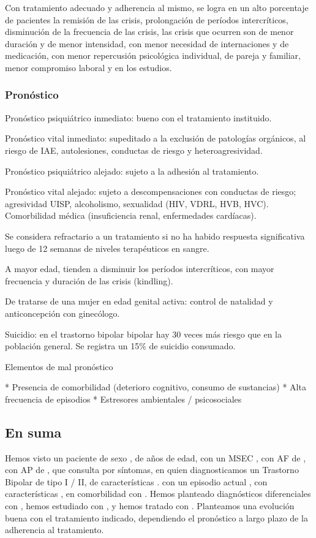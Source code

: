 Con tratamiento adecuado y adherencia al mismo, se logra en un alto porcentaje de pacientes la remisión de las crisis, prolongación de períodos intercríticos, disminución de la frecuencia de las crisis, las crisis que ocurren son de menor duración y de menor intensidad, con menor necesidad de internaciones y de medicación, con menor repercusión psicológica individual, de pareja y familiar, menor compromiso laboral y en los estudios.
\subsubsection*{Pronóstico}
Pronóstico psiquiátrico inmediato: bueno con el tratamiento instituido.

Pronóstico vital inmediato: supeditado a la exclusión de patologías orgánicos, al riesgo de IAE, autolesiones, conductas de riesgo y heteroagresividad.

Pronóstico psiquiátrico alejado: sujeto a la adhesión al tratamiento.

Pronóstico vital alejado: sujeto a descompensaciones con conductas de riesgo; agresividad UISP, alcoholismo, sexualidad (HIV, VDRL, HVB, HVC). Comorbilidad médica (insuficiencia renal, enfermedades cardíacas).

Se considera refractario a un tratamiento si no ha habido respuesta significativa luego de 12 semanas de niveles terapéuticos en sangre.

A mayor edad, tienden a disminuir los períodos intercríticos, con mayor frecuencia y duración de las crisis (kindling).

De tratarse de una mujer en edad genital activa: control de natalidad y anticoncepción con ginecólogo.

Suicidio: en el trastorno bipolar bipolar hay 30 veces más riesgo que en la población general. Se registra un 15\% de suicidio consumado.

Elementos de mal pronóstico

* Presencia de comorbilidad (deterioro cognitivo, consumo de sustancias)
* Alta frecuencia de episodios
* Estresores ambientales / psicosociales

\subsection*{En suma}
Hemos visto un paciente de sexo \faQuestionCircle, de \faQuestionCircle años de edad, con un MSEC \faQuestionCircle, con AF de \faQuestionCircle, con AP de \faQuestionCircle, que consulta por \faQuestionCircle síntomas, en quien diagnosticamos un Trastorno Bipolar de tipo I / II, de características \faQuestionCircle. con un episodio actual \faQuestionCircle, con características \faQuestionCircle, en comorbilidad con \faQuestionCircle. Hemos planteado diagnósticos diferenciales con \faQuestionCircle, hemos estudiado con \faQuestionCircle, y hemos tratado con \faQuestionCircle. Planteamos una evolución buena con el tratamiento indicado, dependiendo el pronóstico a largo plazo de la adherencia al tratamiento.
